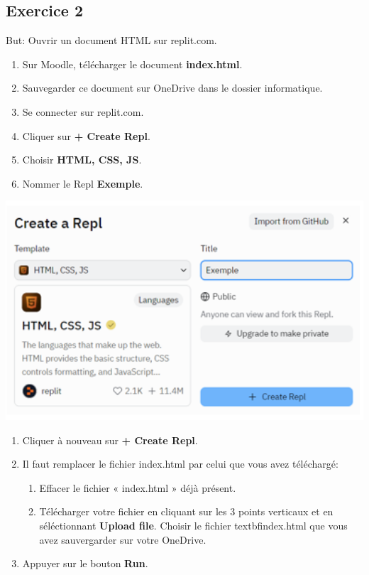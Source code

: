 \documentclass[a4paper,11pt]{article}
\begin{document}
\subsection{Exercice 2}
But: Ouvrir un document HTML sur replit.com.
\begin{multicols}{2}
\begin{enumerate}[label=\arabic*)]
\item Sur Moodle, télécharger le document \textbf{index.html}.
\item Sauvegarder ce document sur OneDrive dans le dossier informatique.
\item Se connecter sur replit.com.
\item Cliquer sur \textbf{+ Create Repl}.
\item Choisir \textbf{HTML, CSS, JS}.
\item Nommer le Repl \textbf{Exemple}.
\end{enumerate}
\includegraphics[width=1\textwidth]{images/replit.png} \\
\end{multicols}
\begin{enumerate}[label=\arabic*)]\addtocounter{enumi}{6}
\item Cliquer à nouveau sur \textbf{+ Create Repl}.
\item Il faut remplacer le fichier index.html par celui que vous avez téléchargé:
\begin{enumerate}
  \item Effacer le fichier « index.html » déjà présent.
  \item Télécharger votre fichier en cliquant sur les 3 points verticaux et en séléctionnant \textbf{Upload file}. Choisir le fichier textbf{index.html} que vous avez sauvergarder sur votre OneDrive.
\end{enumerate}
\item Appuyer sur le bouton \textbf{Run}.
\end{enumerate}
\end{document}
